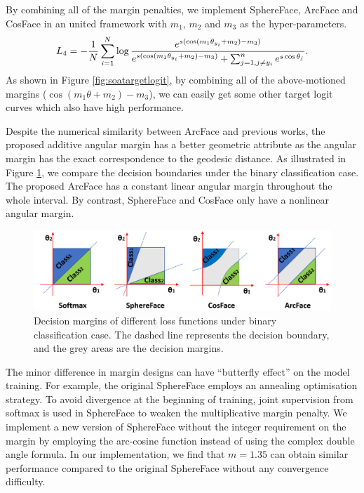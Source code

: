 \documentclass[10pt,twocolumn,letterpaper]{article}
\begin{document}
By combining all of the margin penalties, we implement SphereFace, ArcFace and CosFace in an united framework with $m_1$, $m_2$ and $m_3$ as the hyper-parameters. 
\begin{equation}
\small
{L_4}=-\frac{1}{N}\sum_{i=1}^{N}\log\frac{e^{s(\cos(m_1\theta_{y_i}+m_2)-m_3)}}{e^{s(\cos(m_1\theta_{y_i}+m_2)-m_3)}+\sum_{j=1,j\neq  y_i}^{n}e^{s\cos\theta_{j}}}.
\label{eq:combineloss}
\vspace{-1mm}
\end{equation}
As shown in Figure \ref{fig:soatargetlogit}, by combining all of the above-motioned margins ($\cos(m_1 \theta+m_2)-m_3$), we can easily get some other target logit curves which also have high performance. 

 Despite the numerical similarity between ArcFace and previous works, the proposed additive angular margin has a better geometric attribute as the angular margin has the exact correspondence to the geodesic distance. As illustrated in Figure \ref{fig:binarymargin}, we compare the decision boundaries under the binary classification case. The proposed ArcFace has a constant linear angular margin throughout the whole interval. By contrast, SphereFace and CosFace only have a nonlinear angular margin. 

\begin{figure}[h!]
\centering
\includegraphics[width=1\linewidth]{image/difference/margincompare.png}
\caption{Decision margins of different loss functions under binary classification case. The dashed line represents the decision boundary, and the grey areas are the decision margins.}
\vspace{-4mm}
\label{fig:binarymargin}
\end{figure}

The minor difference in margin designs can have ``butterfly effect'' on the model training. For example, the original SphereFace \cite{liu2017sphereface} employs an annealing optimisation strategy. To avoid divergence at the beginning of training, joint supervision from softmax is used in SphereFace to weaken the multiplicative margin penalty. We implement a new version of SphereFace without the integer requirement on the margin by employing the arc-cosine function instead of using the complex double angle formula. In our implementation, we find that $m=1.35$ can obtain similar performance compared to the original SphereFace without any convergence difficulty. 
\end{document}
